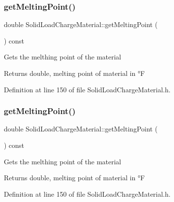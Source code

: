 \subsubsection{\texorpdfstring{get\+Melting\+Point()}{getMeltingPoint()}\hspace{0.1cm}{\footnotesize\ttfamily [1/3]}}
{\footnotesize\ttfamily double Solid\+Load\+Charge\+Material\+::get\+Melting\+Point (\begin{DoxyParamCaption}{ }\end{DoxyParamCaption}) const\hspace{0.3cm}{\ttfamily [inline]}}

Gets the melthing point of the material \begin{DoxyReturn}{Returns}
double, melting point of material in °F 
\end{DoxyReturn}


Definition at line 150 of file Solid\+Load\+Charge\+Material.\+h.

\mbox{\label{class_solid_load_charge_material_a4be001f6e6ecbd2ad0ae1d154559cdb0}} 
\subsubsection{\texorpdfstring{get\+Melting\+Point()}{getMeltingPoint()}\hspace{0.1cm}{\footnotesize\ttfamily [2/3]}}
{\footnotesize\ttfamily double Solid\+Load\+Charge\+Material\+::get\+Melting\+Point (\begin{DoxyParamCaption}{ }\end{DoxyParamCaption}) const\hspace{0.3cm}{\ttfamily [inline]}}

Gets the melthing point of the material \begin{DoxyReturn}{Returns}
double, melting point of material in °F 
\end{DoxyReturn}


Definition at line 150 of file Solid\+Load\+Charge\+Material.\+h.

\mbox{\label{class_solid_load_charge_material_a4be001f6e6ecbd2ad0ae1d154559cdb0}} 
